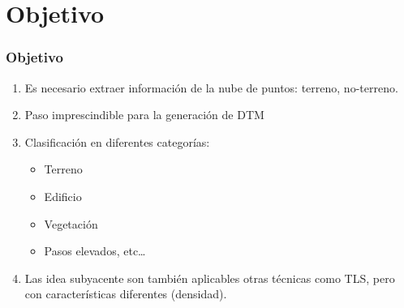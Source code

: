 \LogoOff




\begin{frame}[label=toc]
    \tableofcontents%
\end{frame}

\section[Objetivo]{Objetivo}
\begin{frame}
  \frametitle{Objetivo}
  \begin{enumerate}
    \item Es necesario extraer información de la nube de puntos: terreno,
      no-terreno.
    \item Paso imprescindible para la generación de DTM
    \item Clasificación en diferentes categorías:
      \begin{itemize}
        \item Terreno
        \item Edificio
        \item Vegetación
        \item Pasos elevados, etc\ldots
      \end{itemize}
    \item Las idea subyacente son también aplicables otras técnicas como TLS,
      pero con características diferentes (densidad).
  \end{enumerate}
\end{frame}
